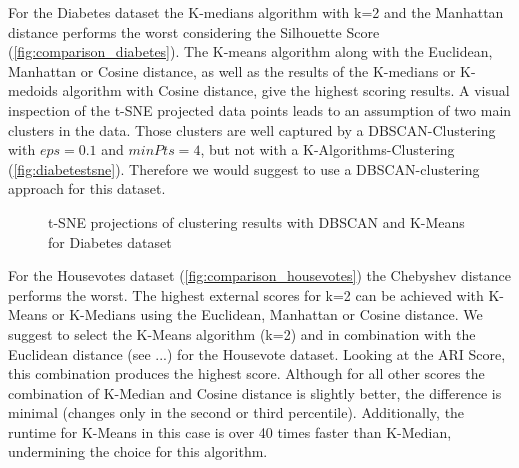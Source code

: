 For the Diabetes dataset the K-medians algorithm with k=2 and the Manhattan distance performs the worst considering the Silhouette Score (\autoref{fig:comparison_diabetes}). The K-means algorithm along with the Euclidean, Manhattan or Cosine distance, as well as the results of the K-medians or K-medoids algorithm with Cosine distance, give the highest scoring results. A visual inspection of the t-SNE projected data points leads to an assumption of two main clusters in the data. Those clusters are well captured by a DBSCAN-Clustering with $eps = 0.1$ and $minPts = 4$, but not with a K-Algorithms-Clustering (\autoref{fig:diabetestsne}). Therefore we would suggest to use a DBSCAN-clustering approach for this dataset. 

\begin{figure}[H]
	\caption{t-SNE projections of clustering results with DBSCAN and K-Means for Diabetes dataset}
	\label{fig:diabetestsne}
\end{figure}
 

For the Housevotes dataset (\autoref{fig:comparison_housevotes}) the Chebyshev distance performs the worst. The highest external scores for k=2 can be achieved with K-Means or K-Medians using the Euclidean, Manhattan or Cosine distance. We suggest to select the K-Means algorithm (k=2) and in combination with the Euclidean distance (see ...) for the Housevote dataset. Looking at the ARI Score, this combination produces the highest score. Although for all other scores the combination of K-Median and Cosine distance is slightly better, the difference is minimal (changes only in the second or third percentile). Additionally, the runtime for K-Means in this case is over 40 times faster than K-Median, undermining the choice for this algorithm.

